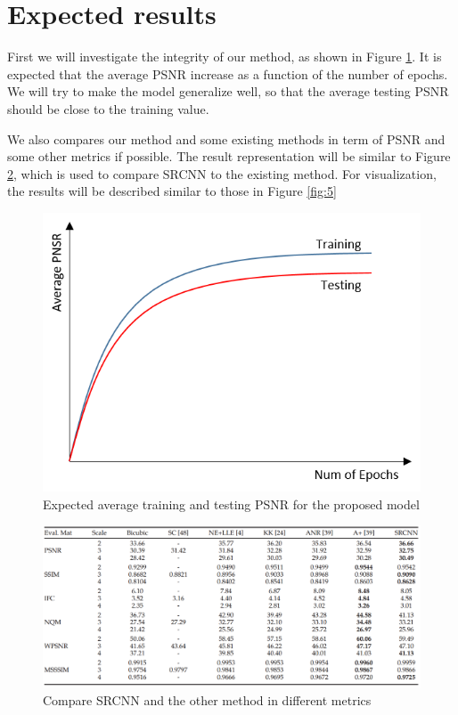\documentclass[10pt]{article}
\begin{document}
\section{Expected results} %
\label{sec:expected_results}
First we will investigate the integrity of our method, as shown in Figure \ref{fig:3}. It is expected that the average PSNR increase as a function of the number of epochs. We will try to make the model generalize well, so that the average testing PSNR should be close to the training value. 

We also compares our method and some existing methods in term of PSNR and some other metrics if possible. The result representation will be similar to Figure \ref{fig:4}, which is used to compare SRCNN \cite{dong2016image} to the existing method. For visualization, the results will be described similar to those in Figure \ref{fig:5}
\begin{figure}[H]
	\centering
	\includegraphics[scale=0.8]{figs/expectedPSNR.png}
	\caption{Expected average training and testing PSNR for the proposed model}
	\label{fig:3}
\end{figure}


\begin{figure}[H]
	\centering
	\includegraphics[scale=0.4]{figs/PSNR_table.png}
	\caption{Compare SRCNN and the other method in different metrics}
	\label{fig:4}
\end{figure}
\end{document}
